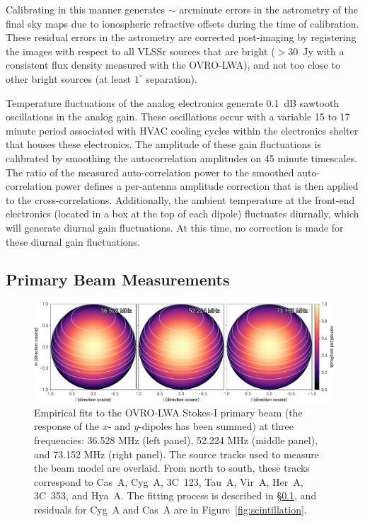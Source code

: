 \documentclass[twocolumn]{aastex61}
\begin{document}
Calibrating in this manner generates $\sim$ arcminute errors in the astrometry of the final sky maps
due to ionospheric refractive offsets during the time of calibration.  These residual errors in the
astrometry are corrected post-imaging by registering the images with respect to all VLSSr
\citep{2014MNRAS.440..327L} sources that are bright ($>30$~Jy with a consistent flux density
measured with the OVRO-LWA), and not too close to other bright sources (at least $1^\circ$
separation).

Temperature fluctuations of the analog electronics generate 0.1~dB sawtooth oscillations in the
analog gain. These oscillations occur with a variable 15 to 17 minute period associated with HVAC
cooling cycles within the electronics shelter that houses these electronics.  The amplitude of these
gain fluctuations is calibrated by smoothing the autocorrelation amplitudes on 45 minute timescales.
The ratio of the measured auto-correlation power to the smoothed auto-correlation power defines a
per-antenna amplitude correction that is then applied to the cross-correlations.  Additionally, the
ambient temperature at the front-end electronics (located in a box at the top of each dipole)
fluctuates diurnally, which will generate diurnal gain fluctuations. At this time, no correction is
made for these diurnal gain fluctuations.

\subsection{Primary Beam Measurements}\label{sec:beam}

\begin{figure}[t]
    \includegraphics[width=\textwidth]{figures/beam/beam}
    \caption{
        Empirical fits to the OVRO-LWA Stokes-I primary beam (the response of the $x$- and
        $y$-dipoles has been summed) at three frequencies: 36.528 MHz (left panel), 52.224 MHz
        (middle panel), and 73.152 MHz (right panel). The source tracks used to measure the beam
        model are overlaid. From north to south, these tracks correspond to Cas~A, Cyg~A, 3C~123,
        Tau~A, Vir~A, Her~A, 3C~353, and Hya~A.  The fitting process is described in
        \S\ref{sec:beam}, and residuals for Cyg~A and Cas~A are in Figure~\ref{fig:scintillation}.
    }
    \label{fig:beam}
\end{figure}
\end{document}
